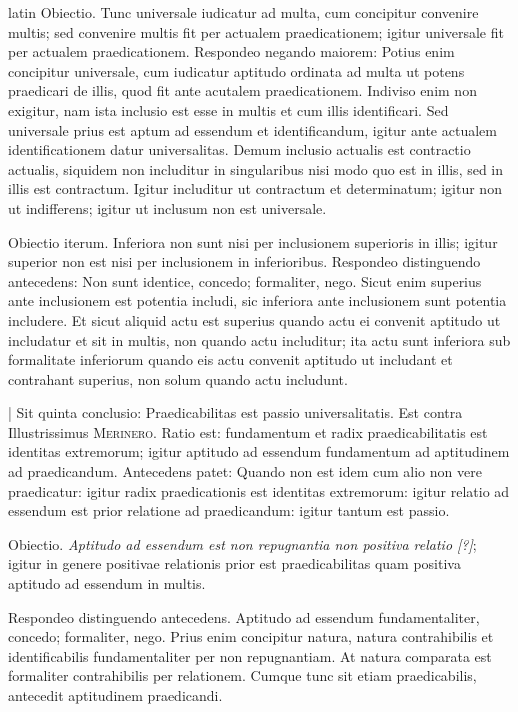 \begin{otherlanguage*}{latin}
\pstart
Obiectio. Tunc universale iudicatur ad multa, cum concipitur convenire multis; sed convenire multis fit per actualem praedicationem; igitur universale fit per actualem praedicationem. Respondeo negando maiorem:
Potius enim concipitur universale, cum iudicatur aptitudo ordinata ad multa ut potens praedicari de illis, quod fit ante acutalem praedicationem. Indiviso enim non exigitur, nam ista inclusio est esse in multis et cum illis identificari. Sed universale prius est aptum ad essendum et identificandum, igitur ante actualem identificationem datur universalitas. Demum inclusio actualis est contractio actualis, siquidem non includitur in singularibus nisi modo quo est in illis, sed in illis est contractum. Igitur includitur ut contractum et determinatum; igitur non ut indifferens; igitur ut inclusum non est universale. 
\pend

\pstart
Obiectio iterum. Inferiora non sunt nisi per inclusionem superioris in illis; igitur superior non est nisi per inclusionem in inferioribus. Respondeo distinguendo antecedens:
Non sunt identice, concedo; formaliter, nego. Sicut enim superius ante inclusionem est potentia includi, sic inferiora ante inclusionem sunt potentia includere. Et sicut aliquid actu est superius quando actu ei convenit aptitudo ut includatur et sit in multis, non quando actu includitur; ita actu sunt inferiora sub formalitate inferiorum quando eis actu convenit aptitudo ut includant et contrahant superius, non solum quando actu includunt. 
\pend

\pstart
\textnormal{|} Sit quinta conclusio:
Praedicabilitas est passio universalitatis. Est contra Illustrissimus \textsc{Merinero}\index[persons]{}. Ratio est:
fundamentum et radix praedicabilitatis est identitas extremorum; igitur aptitudo ad essendum fundamentum ad aptitudinem ad praedicandum. Antecedens patet:
Quando non est idem cum alio non vere praedicatur:
igitur radix praedicationis est identitas extremorum:
igitur relatio ad essendum est prior relatione ad praedicandum:
igitur tantum est passio. 
\pend

\pstart
Obiectio. \emph{Aptitudo ad essendum est non repugnantia non positiva relatio [?]}; igitur in genere positivae relationis prior est praedicabilitas quam positiva aptitudo ad essendum in multis. 
\pend

\pstart
Respondeo distinguendo antecedens. Aptitudo ad essendum fundamentaliter, concedo; formaliter, nego. Prius enim concipitur natura, natura  contrahibilis et identificabilis fundamentaliter per non repugnantiam. At natura comparata est formaliter contrahibilis per relationem. Cumque tunc sit etiam praedicabilis, antecedit aptitudinem praedicandi. 
\pend


\end{otherlanguage*}
